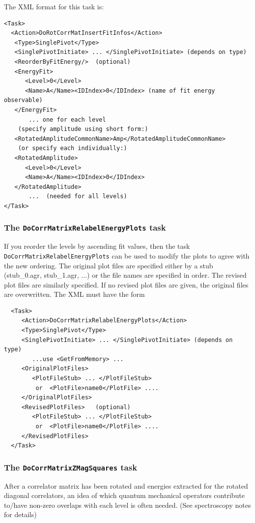 \documentclass[12pt]{article}
\newcommand{\vb}{\texttt}
\begin{document}
The XML format for this task is:
\begin{verbatim}
<Task>
  <Action>DoRotCorrMatInsertFitInfos</Action>
   <Type>SinglePivot</Type>
   <SinglePivotInitiate> ... </SinglePivotInitiate> (depends on type)
   <ReorderByFitEnergy/>  (optional)
   <EnergyFit>
      <Level>0</Level>
      <Name>A</Name><IDIndex>0</IDIndex> (name of fit energy observable)
   </EnergyFit>
       ... one for each level
    (specify amplitude using short form:)
   <RotatedAmplitudeCommonName>Amp</RotatedAmplitudeCommonName>
    (or specify each individually:)
   <RotatedAmplitude>
      <Level>0</Level>
      <Name>A</Name><IDIndex>0</IDIndex>
   </RotatedAmplitude>
       ...  (needed for all levels)
</Task>
\end{verbatim}

\subsubsection{The \vb{DoCorrMatrixRelabelEnergyPlots} task}
If you reorder the levels by ascending fit values, then the task\newline
\vb{DoCorrMatrixRelabelEnergyPlots} can be used to modify the plots to
agree with the new ordering.  The original plot files are specified either
by a stub (stub\_0.agr, stub\_1.agr, ...) or the file names are specified
in order.  The revised plot files are similarly specified.  If no revised
plot files are given, the original files are overwritten.  The XML must
have the form

\begin{verbatim}
  <Task>
     <Action>DoCorrMatrixRelabelEnergyPlots</Action>
     <Type>SinglePivot</Type>
     <SinglePivotInitiate> ... </SinglePivotInitiate> (depends on type)
        ...use <GetFromMemory> ...
     <OriginalPlotFiles>
        <PlotFileStub> ... </PlotFileStub>
         or  <PlotFile>name0</PlotFile> ....
     </OriginalPlotFiles>
     <RevisedPlotFiles>   (optional)
        <PlotFileStub> ... </PlotFileStub>
         or  <PlotFile>name0</PlotFile> ....
     </RevisedPlotFiles>
  </Task>
\end{verbatim}

\subsubsection{The \vb{DoCorrMatrixZMagSquares} task}
After a correlator matrix has been rotated and energies extracted for the rotated diagonal correlators,
an idea of which quantum mechanical operators contribute to/have non-zero overlaps with each level is
often needed. (See spectroscopy notes for details)
\end{document}
